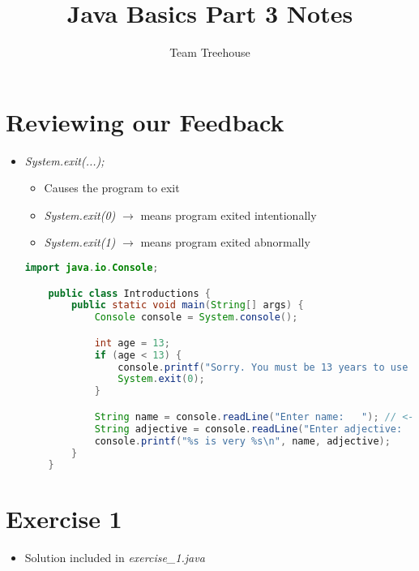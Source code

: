 \documentclass[12pt]{article}
\begin{document}
\title{Java Basics Part 3 Notes}
\author{Team Treehouse}
\maketitle

\section{Reviewing our Feedback}

\bigskip

\begin{itemize}
    \item  \textit{System.exit(...);}
    \begin{itemize}
        \item Causes the program to exit
        \item \textit{System.exit(0)} $\to$ means program exited intentionally
        \item \textit{System.exit(1)} $\to$ means program exited abnormally
    \end{itemize}

    \bigskip

    \begin{lstlisting}[language=Java]
    import java.io.Console;

    public class Introductions {
        public static void main(String[] args) {
            Console console = System.console();

            int age = 13;
            if (age < 13) {
                console.printf("Sorry. You must be 13 years to use this program");
                System.exit(0);
            }

            String name = console.readLine("Enter name:   "); // <- Let's write 'Moe' here
            String adjective = console.readLine("Enter adjective:   "); // <- and 'glad to be with his love' here :)
            console.printf("%s is very %s\n", name, adjective);
        }
    }
    \end{lstlisting}

\end{itemize}

\bigskip

\section{Exercise 1}

\bigskip

\begin{itemize}
    \item Solution included in \textit{exercise\_1.java}
\end{itemize}
\end{document}
